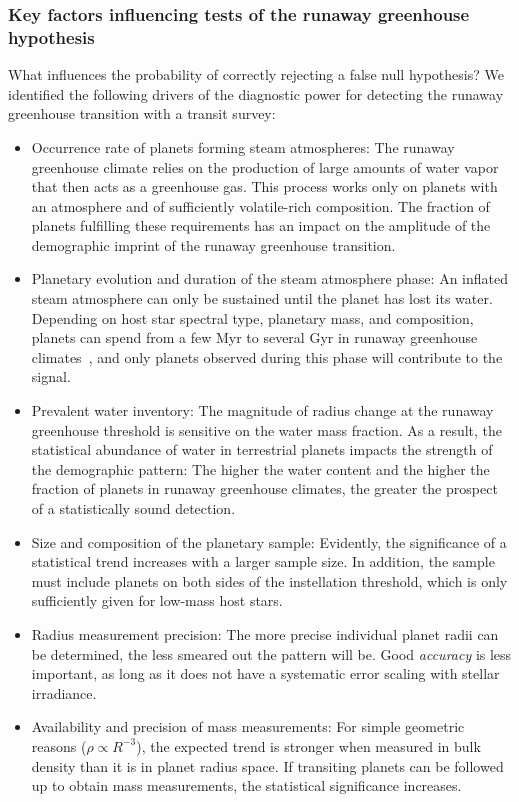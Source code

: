 \documentclass[twocolumn]{aastex631}
\begin{document}
\subsubsection{Key factors influencing tests of the runaway greenhouse hypothesis}
What influences the probability of correctly rejecting a false null hypothesis?
We identified the following drivers of the diagnostic power for detecting the runaway greenhouse transition with a transit survey:
\begin{itemize}
    \item Occurrence rate of planets forming steam atmospheres: The runaway greenhouse climate relies on the production of large amounts of water vapor that then acts as a greenhouse gas. This process works only on planets with an atmosphere and of sufficiently volatile-rich composition. The fraction of planets fulfilling these requirements has an impact on the amplitude of the demographic imprint of the runaway greenhouse transition.
    \item Planetary evolution and duration of the steam atmosphere phase: An inflated steam atmosphere can only be sustained until the planet has lost its water. Depending on host star spectral type, planetary mass, and composition, planets can spend from a few Myr to several Gyr in runaway greenhouse climates~\citep[][]{Hamano2015,Luger2015}, and only planets observed during this phase will contribute to the signal.
    \item Prevalent water inventory: The magnitude of radius change at the runaway greenhouse threshold is sensitive on the water mass fraction. As a result, the statistical abundance of water in terrestrial planets impacts the strength of the demographic pattern:
        The higher the water content and the higher the fraction of planets in runaway greenhouse climates, the greater the prospect of a statistically sound detection.
    \item Size and composition of the planetary sample: Evidently, the significance of a statistical trend increases with a larger sample size. In addition, the sample must include planets on both sides of the instellation threshold, which is only sufficiently given for low-mass host stars.
    \item Radius measurement precision: The more precise individual planet radii can be determined, the less smeared out the pattern will be. Good \textit{accuracy} is less important, as long as it does not have a systematic error scaling with stellar irradiance.
    \item Availability and precision of mass measurements: For simple geometric reasons ($\rho \propto R^{-3}$), the expected trend is stronger when measured in bulk density than it is in planet radius space. If transiting planets can be followed up to obtain mass measurements, the statistical significance increases.
\end{itemize}
\end{document}
